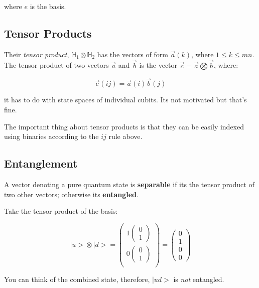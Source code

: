 \documentclass[letterpaper]{article}
\begin{document}
where \(e\) is the basis.

\subsection{Tensor Products}
\label{sec:orgf3bd671}
Their \emph{tensor product}, \(\mathbb{H}_1 \otimes \mathbb{H}_2\) has the vectors of form \(\vec{a}(k)\), where \(1 \leq k \leq mn\). The tensor product of two vectors \(\vec{a}\) and \(\vec{b}\) is the vector \(\vec{c}=\vec{a} \bigotimes \vec{b}\), where:

\begin{equation}
   \vec{c}(ij) = \vec{a}(i)\vec{b}(j)
\end{equation}

it has to do with state spaces of individual cubits. Its not motivated but that's fine.

The important thing about tensor products is that they can be easily indexed using binaries according to the \(ij\) rule above.

\subsection{Entanglement}
\label{sec:org89265ba}
A vector denoting a pure quantum state is \textbf{separable} if its the tensor product of two other vectors; otherwise its \textbf{entangled}.

Take the tensor product of the basis:

\begin{equation}
   | u \big > \otimes | d \big > = \begin{pmatrix}
1 \begin{pmatrix} 0 \\ 1 \end{pmatrix} \\
0 \begin{pmatrix} 0 \\ 1 \end{pmatrix} \\
\end{pmatrix} = \begin{pmatrix}
0 \\ 1 \\ 0 \\ 0
\end{pmatrix}
\end{equation}

You can think of the combined state, therefore, \(|ud \big>\) is \emph{not} entangled.
\end{document}
